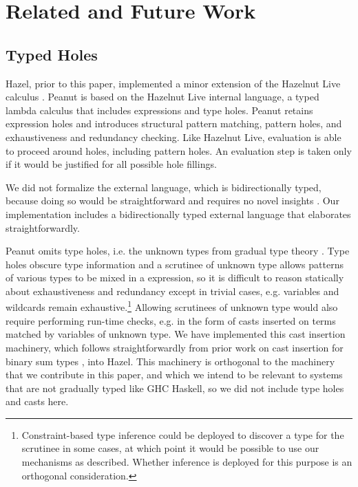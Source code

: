 \section{Related and Future Work}

\subsection{Typed Holes}
Hazel, prior to this paper, implemented a minor extension of the Hazelnut Live calculus \cite{DBLP:journals/pacmpl/OmarVCH19}. Peanut is based on the Hazelnut Live internal language, a typed lambda calculus that includes expressions and type holes. 
Peanut retains expression holes and introduces   
structural pattern matching, pattern holes, and exhaustiveness and redundancy checking. 
Like Hazelnut Live, evaluation is able to proceed around holes, including pattern holes. An evaluation step is taken 
only if it would be justified for all possible hole fillings.

We did not formalize the external language, which is bidirectionally typed, because doing so would be straightforward and requires no 
novel insights \cite{DBLP:journals/csur/DunfieldK21}. Our implementation includes a bidirectionally typed external language that elaborates straightforwardly.

Peanut omits type holes, i.e. the unknown types from gradual type theory \cite{Siek2006, DBLP:conf/snapl/SiekVCB15}. Type holes obscure type information and a scrutinee of unknown type allows patterns of various types to be mixed in a  expression, so it 
is difficult to reason statically about exhaustiveness and redundancy except in trivial cases, e.g. variables and wildcards remain exhaustive.\footnote{Constraint-based type inference could be deployed to discover a type for the scrutinee in some cases, at which point it would be possible to use our mechanisms as described. Whether inference is deployed for this purpose is an orthogonal consideration.}
Allowing scrutinees of unknown type would also require performing run-time checks, e.g. in the form of casts inserted on terms matched by variables of unknown type. 
We have implemented this cast insertion machinery, which follows straightforwardly from prior work on cast insertion for binary sum types \cite{DBLP:conf/snapl/SiekVCB15}, into Hazel. This machinery is orthogonal to the machinery that we contribute in this paper, and which we intend to be relevant to systems that are not gradually typed like {GHC Haskell}, so we did not include type holes and casts here. 

